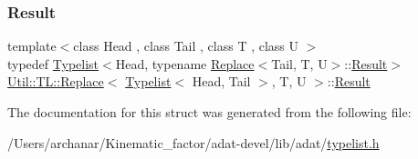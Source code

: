 \mbox{\label{structUtil_1_1TL_1_1Replace_3_01Typelist_3_01Head_00_01Tail_01_4_00_01T_00_01U_01_4_a218cadcba3503c01d97b4a6d4e65982c}} 
\subsubsection{\texorpdfstring{Result}{Result}\hspace{0.1cm}{\footnotesize\ttfamily [3/3]}}
{\footnotesize\ttfamily template$<$class Head , class Tail , class T , class U $>$ \\
typedef \mbox{\hyperlink{structUtil_1_1Typelist}{Typelist}}$<$Head, typename \mbox{\hyperlink{structUtil_1_1TL_1_1Replace}{Replace}}$<$Tail, T, U$>$\+::\mbox{\hyperlink{structUtil_1_1TL_1_1Replace_3_01Typelist_3_01Head_00_01Tail_01_4_00_01T_00_01U_01_4_a218cadcba3503c01d97b4a6d4e65982c}{Result}}$>$ \mbox{\hyperlink{structUtil_1_1TL_1_1Replace}{Util\+::\+T\+L\+::\+Replace}}$<$ \mbox{\hyperlink{structUtil_1_1Typelist}{Typelist}}$<$ Head, Tail $>$, T, U $>$\+::\mbox{\hyperlink{structUtil_1_1TL_1_1Replace_3_01Typelist_3_01Head_00_01Tail_01_4_00_01T_00_01U_01_4_a218cadcba3503c01d97b4a6d4e65982c}{Result}}}



The documentation for this struct was generated from the following file\+:\begin{DoxyCompactItemize}
\item 
/\+Users/archanar/\+Kinematic\+\_\+factor/adat-\/devel/lib/adat/\mbox{\hyperlink{adat-devel_2lib_2adat_2typelist_8h}{typelist.\+h}}\end{DoxyCompactItemize}
